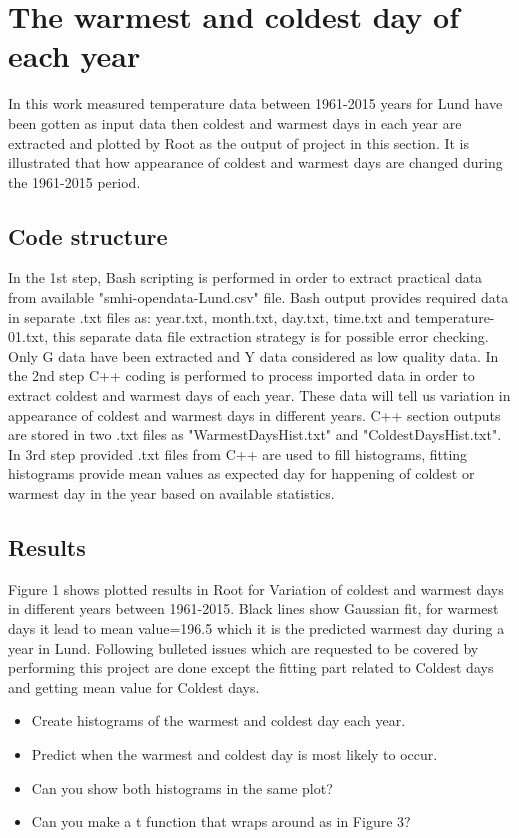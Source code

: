 

\section{The warmest and coldest day of each year}
In this work measured temperature data between 1961-2015 years for Lund have been gotten as input data then coldest and warmest days in each year are extracted and plotted by Root as the output of project in this section. It is illustrated that how appearance of coldest and warmest days are changed during the 1961-2015 period.

\subsection{Code structure}
In the 1st step, Bash scripting is performed in order to extract practical data from available "smhi-opendata-Lund.csv" file. Bash output provides required data in separate .txt files as: year.txt, month.txt, day.txt, time.txt and temperature-01.txt, this separate data file extraction strategy is for possible error checking. Only G data have been extracted and Y data considered as low quality data. In the 2nd step C++ coding is performed to process imported data in order to extract coldest and warmest days of each year. These data will tell us variation in appearance of coldest and warmest days in different years. C++ section outputs are stored in two .txt files as "WarmestDaysHist.txt" and "ColdestDaysHist.txt". In 3rd step provided .txt files from C++ are used to fill histograms, fitting histograms provide mean values as expected day for happening of coldest or warmest day in the year based on available statistics.  

\subsection{Results}
Figure 1 shows plotted results in Root for Variation of coldest and warmest days in different years between 1961-2015. Black lines show Gaussian fit, for warmest days it lead to mean value=196.5 which it is the predicted warmest day during a year in Lund. 
Following bulleted issues which are requested to be covered by performing this project are done except the fitting part related to Coldest days and getting mean value for Coldest days.

\begin{itemize}
\item   Create histograms of the warmest and coldest day each year.
\item   Predict when the warmest and coldest day is most likely to occur.
\item	Can you show both histograms in the same plot?
\item	Can you make a t function that wraps around as in Figure 3?
\end{itemize}

